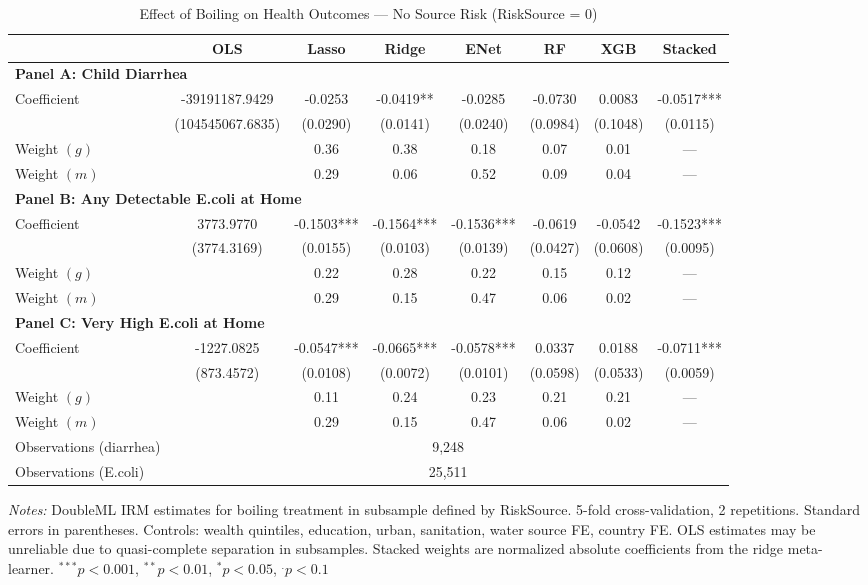 \begin{table}[htbp]
\centering
\caption{Effect of Boiling on Health Outcomes --- No Source Risk (RiskSource = 0)}
\label{tab:subgroup_risk0}
\begin{tabular}{lccccccc}
\toprule
 & OLS & Lasso & Ridge & ENet & RF & XGB & Stacked \\
\midrule
\multicolumn{8}{l}{\textbf{Panel A: Child Diarrhea}} \\
\midrule
Coefficient & -39191187.9429 & -0.0253 & -0.0419** & -0.0285 & -0.0730 & 0.0083 & -0.0517*** \\
 & (104545067.6835) & (0.0290) & (0.0141) & (0.0240) & (0.0984) & (0.1048) & (0.0115) \\
Weight $(g)$ &  & 0.36 & 0.38 & 0.18 & 0.07 & 0.01 & --- \\
Weight $(m)$ &  & 0.29 & 0.06 & 0.52 & 0.09 & 0.04 & --- \\

\multicolumn{8}{l}{\textbf{Panel B: Any Detectable E.coli at Home}} \\
\midrule
Coefficient & 3773.9770 & -0.1503*** & -0.1564*** & -0.1536*** & -0.0619 & -0.0542 & -0.1523*** \\
 & (3774.3169) & (0.0155) & (0.0103) & (0.0139) & (0.0427) & (0.0608) & (0.0095) \\
Weight $(g)$ &  & 0.22 & 0.28 & 0.22 & 0.15 & 0.12 & --- \\
Weight $(m)$ &  & 0.29 & 0.15 & 0.47 & 0.06 & 0.02 & --- \\

\multicolumn{8}{l}{\textbf{Panel C: Very High E.coli at Home}} \\
\midrule
Coefficient & -1227.0825 & -0.0547*** & -0.0665*** & -0.0578*** & 0.0337 & 0.0188 & -0.0711*** \\
 & (873.4572) & (0.0108) & (0.0072) & (0.0101) & (0.0598) & (0.0533) & (0.0059) \\
Weight $(g)$ &  & 0.11 & 0.24 & 0.23 & 0.21 & 0.21 & --- \\
Weight $(m)$ &  & 0.29 & 0.15 & 0.47 & 0.06 & 0.02 & --- \\

\midrule
Observations (diarrhea) & \multicolumn{7}{c}{9,248} \\
Observations (E.coli) & \multicolumn{7}{c}{25,511} \\
\bottomrule
\end{tabular}
\begin{minipage}{\textwidth}
\footnotesize
\textit{Notes:} DoubleML IRM estimates for boiling treatment in subsample defined by RiskSource. 
5-fold cross-validation, 2 repetitions. Standard errors in parentheses. 
Controls: wealth quintiles, education, urban, sanitation, water source FE, country FE. 
OLS estimates may be unreliable due to quasi-complete separation in subsamples. 
Stacked weights are normalized absolute coefficients from the ridge meta-learner. 
$^{***}p<0.001$, $^{**}p<0.01$, $^{*}p<0.05$, $^{.}p<0.1$
\end{minipage}
\end{table}
